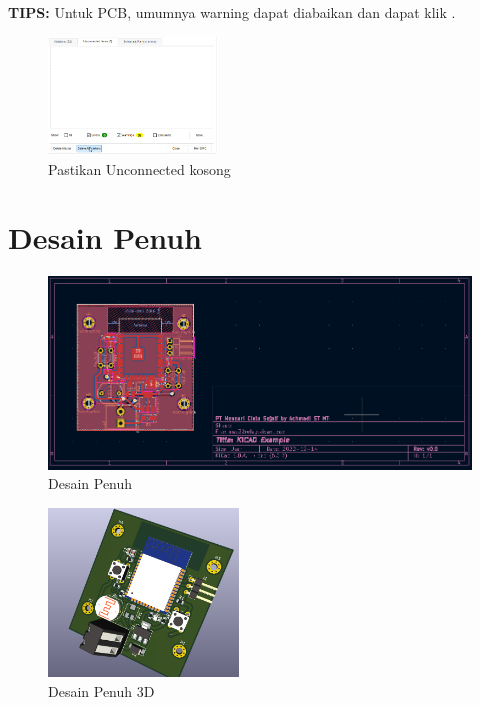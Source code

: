 \documentclass[12pt]{book}
\begin{document}
	\textbf{TIPS:} Untuk PCB, umumnya warning dapat diabaikan dan dapat klik .

	\begin{figure}[!ht]
		\centering
		\includegraphics[width=0.4\textwidth]{images/pcb/drc_2}
		\caption{Pastikan Unconnected kosong}
	\end{figure}

	\newpage
	\section{Desain Penuh}

	\begin{figure}[!ht]
		\centering
		\includegraphics[width=\textwidth]{images/pcb/esp32relay}
		\caption{Desain Penuh}
	\end{figure}

	\begin{figure}[!ht]
		\centering
		\includegraphics[width=0.45\textwidth]{images/pcb/esp32relay_3d}
		\caption{Desain Penuh 3D}
	\end{figure}
\end{document}
